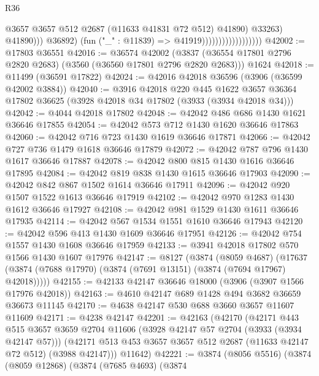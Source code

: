 \begin{lexlean}{R36}
\begin{coremodule}
                                                  @3657
                                                  @3657
                                                  @512
                                                  @2687
                                                  (@11633 @41831 @72 @512)
                                                  @41890)
                                                @33263)
                                              @41890)))
                                        @36892)
                                      (fun ("_" : @11839) => @41919))))))))))))))))))
@42002 := @17803 @36551
@42016 := @36574
    @42002
    (@3837 (@36554 @17801 @2796 @2820 @2683) (@3560 (@36560 @17801 @2796 @2820 @2683)))
    @1624
@42018 := @11499 (@36591 @17822)
@42024 := @42016 @42018 @36596 (@3906 (@36599 @42002 @3884))
@42040 := @3916
    @42018
    @220
    @445
    @1622
    @3657
    @36364
    @17802
    @36625
    (@3928 @42018 @34 @17802 (@3933 (@3934 @42018 @34)))
@42042 := @4044 @42018 @17802
@42048 := @42042 @486 @686 @1430 @1621 @36646 @17855
@42054 := @42042 @573 @712 @1430 @1620 @36646 @17863
@42060 := @42042 @716 @723 @1430 @1619 @36646 @17871
@42066 := @42042 @727 @736 @1479 @1618 @36646 @17879
@42072 := @42042 @787 @796 @1430 @1617 @36646 @17887
@42078 := @42042 @800 @815 @1430 @1616 @36646 @17895
@42084 := @42042 @819 @838 @1430 @1615 @36646 @17903
@42090 := @42042 @842 @867 @1502 @1614 @36646 @17911
@42096 := @42042 @920 @1507 @1522 @1613 @36646 @17919
@42102 := @42042 @970 @1283 @1430 @1612 @36646 @17927
@42108 := @42042 @981 @1529 @1430 @1611 @36646 @17935
@42114 := @42042 @567 @1534 @1551 @1610 @36646 @17943
@42120 := @42042 @596 @413 @1430 @1609 @36646 @17951
@42126 := @42042 @754 @1557 @1430 @1608 @36646 @17959
@42133 := @3941 @42018 @17802 @570 @1566 @1430 @1607 @17976
@42147 := @8127
    (@3874
      (@8059 @4687)
      (@17637 (@3874 (@7688 @17970) (@3874 (@7691 @13151) (@3874 (@7694 @17967) @42018)))))
@42155 := @42133 @42147 @36646 @18000 (@3906 (@3907 @1566 @17976 @42018))
@42163 := @4610 @42147 @689 @1428 @494 @3682 @36659 @36673 @11145
@42170 := @4638 @42147 @530 @688 @3660 @3657 @11607 @11609
@42171 := @4238 @42147
@42201 := @42163
    (@42170
      (@42171
        @443
        @515
        @3657
        @3659
        @2704
        @11606
        (@3928 @42147 @57 @2704 (@3933 (@3934 @42147 @57)))
        (@42171 @513 @453 @3657 @3657 @512 @2687 (@11633 @42147 @72 @512) (@3988 @42147)))
      @11642)
@42221 := @3874
    (@8056 @5516)
    (@3874
      (@8059 @12868)
      (@3874
        (@7685 @4693)
        (@3874

\end{coremodule}
\end{lexlean}
